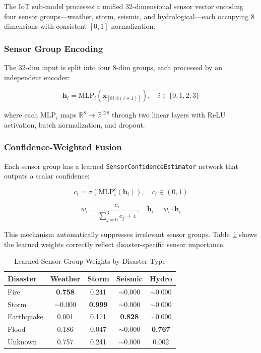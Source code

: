 \documentclass[journal]{IEEEtran}
\begin{document}
The IoT sub-model processes a unified 32-dimensional sensor vector encoding four sensor groups---weather, storm, seismic, and hydrological---each occupying 8 dimensions with consistent $[0, 1]$ normalization.

\subsubsection{Sensor Group Encoding}

The 32-dim input is split into four 8-dim groups, each processed by an independent encoder:

\begin{equation}
\mathbf{h}_i = \text{MLP}_i(\mathbf{x}_{[8i:8(i+1)]}), \quad i \in \{0,1,2,3\}
\end{equation}

where each $\text{MLP}_i$ maps $\mathbb{R}^8 \to \mathbb{R}^{128}$ through two linear layers with ReLU activation, batch normalization, and dropout.

\subsubsection{Confidence-Weighted Fusion}

Each sensor group has a learned \texttt{SensorConfidenceEstimator} network that outputs a scalar confidence:

\begin{equation}
c_i = \sigma(\text{MLP}^c_i(\mathbf{h}_i)), \quad c_i \in (0, 1)
\end{equation}

\begin{equation}
w_i = \frac{c_i}{\sum_{j=0}^{3} c_j + \epsilon}, \quad \tilde{\mathbf{h}}_i = w_i \cdot \mathbf{h}_i
\end{equation}

This mechanism automatically suppresses irrelevant sensor groups. Table~\ref{tab:sensor_weights} shows the learned weights correctly reflect disaster-specific sensor importance.

\begin{table}[!t]
\centering
\caption{Learned Sensor Group Weights by Disaster Type}
\label{tab:sensor_weights}
\begin{tabular}{lcccc}
\toprule
\textbf{Disaster} & \textbf{Weather} & \textbf{Storm} & \textbf{Seismic} & \textbf{Hydro} \\
\midrule
Fire       & \textbf{0.758} & 0.241 & $\sim$0.000 & $\sim$0.000 \\
Storm      & $\sim$0.000 & \textbf{0.999} & $\sim$0.000 & $\sim$0.000 \\
Earthquake & 0.001 & 0.171 & \textbf{0.828} & $\sim$0.000 \\
Flood      & 0.186 & 0.047 & $\sim$0.000 & \textbf{0.767} \\
Unknown    & 0.757 & 0.241 & $\sim$0.000 & 0.002 \\
\bottomrule
\end{tabular}
\end{table}
\end{document}
